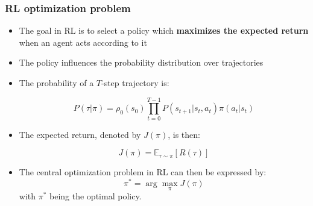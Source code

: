 \documentclass[9pt]{beamer}
\newcommand{\E}{{\mathbb E}}
\begin{document}



\begin{frame}

	\frametitle{RL optimization problem}

		\begin{itemize}
			\item The goal in RL is to select a policy which \textbf{maximizes the expected return} when an agent acts according to it

			\item The policy influences the probability distribution over trajectories
			\item The probability of a $T$-step trajectory is:

			\begin{equation}
				P(\tau|\pi) = \rho_0 (s_0) \prod_{t=0}^{T-1} P(s_{t+1} | s_t, a_t) \pi(a_t | s_t)
			\end{equation}
		
		
		\item The expected return, denoted by $J(\pi)$, is then:

			\begin{equation}
			J(\pi) = \E_{\tau\sim \pi}{[R(\tau)]}
			\label{eq:loss}
			\end{equation}

		\item The central optimization problem in RL can then be expressed by:
			\begin{equation}
			\pi^* = \arg \max_{\pi} J(\pi)
			\label{eq:max_loss}
			\end{equation}
				with $\pi^*$ being the optimal policy.
		\end{itemize}
		
\end{frame}

\end{document}
